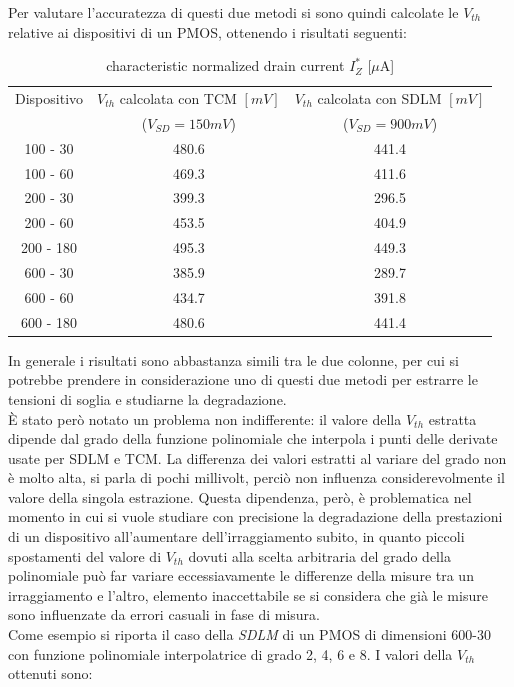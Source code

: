 \documentclass[12pt, letterpaper]{book}
\begin{document}
Per valutare l'accuratezza di questi due metodi si sono quindi calcolate le $V_{th}$ relative ai dispositivi di un PMOS, ottenendo i risultati seguenti:

\begin{table}[h!] 
\renewcommand{\arraystretch}{1.3}
\caption{characteristic normalized drain current $I^{*}_{Z}$ [$\mu$A]}
\label{tab:Iz*} 
\begin{center}
\begin{tabular}{ c  c  c }
\hline
Dispositivo &  $V_{th}$  calcolata con TCM $[mV]$  & $V_{th}$  calcolata con SDLM $[mV]$ \\
 & ($V_{SD} = 150 mV$) & ($V_{SD} = 900 mV$) \\
\hline
100 - 30  & 480.6 & 441.4 \\
\hline
100 - 60  & 469.3 & 411.6 \\
\hline
200 - 30  & 399.3 & 296.5 \\
\hline
200 - 60  & 453.5 & 404.9 \\
\hline
200 - 180 & 495.3 & 449.3 \\
\hline
600 - 30 & 385.9 & 289.7 \\
\hline
600 - 60 & 434.7 & 391.8 \\
\hline
600 - 180 & 480.6 & 441.4 \\
\hline

\end{tabular}
\end{center}
\end{table} 

In generale i risultati sono abbastanza simili tra le due colonne, per cui si potrebbe prendere in considerazione uno di questi due metodi  per estrarre le tensioni di soglia e studiarne la degradazione.\\
È stato però notato un problema non indifferente: il valore della $V_{th}$ estratta dipende dal grado della funzione polinomiale che interpola i punti delle derivate usate per SDLM e TCM. La differenza dei valori estratti al variare del grado non è molto alta, si parla di pochi millivolt, perciò non influenza considerevolmente il valore della singola estrazione. Questa dipendenza, però, è problematica nel momento in cui si vuole studiare con precisione la degradazione della prestazioni di un dispositivo all'aumentare dell'irraggiamento subito, in quanto piccoli spostamenti del valore di $V_{th}$ dovuti alla scelta arbitraria del grado della polinomiale può far variare eccessiavamente le differenze della misure tra un irraggiamento e l'altro, elemento inaccettabile se si considera che già le misure sono influenzate da errori casuali in fase di misura.\\
Come esempio si riporta il caso della \emph{SDLM} di un PMOS di dimensioni 600-30 con funzione polinomiale interpolatrice di grado 2, 4, 6 e 8. I valori della $V_{th}$ ottenuti sono: 
\end{document}
